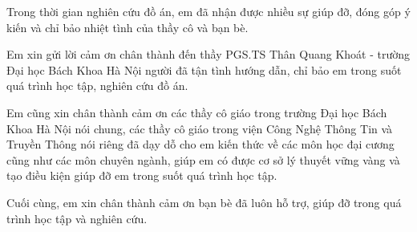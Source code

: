 



\setlength{\parindent}{4ex}
\setlength{\parskip}{1em}

Trong thời gian nghiên cứu đồ án, em đã nhận được nhiều sự giúp đỡ, đóng góp ý kiến và chỉ bảo nhiệt tình của thầy cô và bạn bè.\par

Em xin gửi lời cảm ơn chân thành đến thầy PGS.TS Thân Quang Khoát - trường Đại học Bách Khoa Hà Nội người đã tận tình hướng dẫn, chỉ bảo em trong suốt quá trình học tập, nghiên cứu đồ án.\par

Em cũng xin chân thành cảm ơn các thầy cô giáo trong trường Đại học Bách Khoa Hà Nội nói chung, các thầy cô giáo trong viện Công Nghệ Thông Tin và Truyền Thông nói riêng đã dạy dỗ cho em kiến thức về các môn học đại cương cũng như các môn chuyên ngành, giúp em có được cơ sở lý thuyết vững vàng và tạo điều kiện giúp đỡ em trong suốt quá trình học tập.\par

Cuối cùng, em xin chân thành cảm ơn bạn bè đã luôn hỗ trợ, giúp đỡ trong quá trình học tập và nghiên cứu.


  

\pagebreak